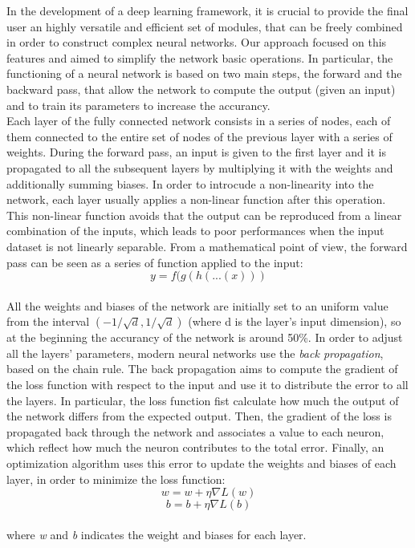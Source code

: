 \documentclass[10pt,conference,compsocconf]{IEEEtran}
\begin{document}
   In the development of a deep learning framework, it is crucial to provide the final user an highly versatile and efficient set of modules, that can be freely combined in order to construct complex neural networks. Our approach focused on this features and aimed to simplify the network basic operations. In particular, the functioning of a neural network is based on two main steps, the forward and the backward pass, that allow the network to compute the output (given an input) and to train its parameters to increase the accurancy.\\
   Each layer of the fully connected network consists in a series of nodes, each of them connected to the entire set of nodes of the previous layer with a series of weights. During the forward pass, an input is given to the first layer and it is propagated to all the subsequent layers by multiplying it with the weights and additionally summing biases. In order to introcude a non-linearity into the network, each layer usually applies a non-linear function after this operation. This non-linear function avoids that the output can be reproduced from a linear combination of the inputs, which leads to poor performances when the input dataset is not linearly separable. From a mathematical point of view, the forward pass can be seen as a series of function applied to the input:\\
   \[y = f(g(h(...(x)))\]\\
   All the weights and biases of the network are initially set to an uniform value from the interval $(-1/\sqrt{d}, 1/\sqrt{d}) $ (where d is the layer's input dimension), so at the beginning the accurancy of the network is around 50\%. In order to adjust all the layers' parameters, modern neural networks use the \textit{back propagation}, based on the chain rule. The back propagation aims to compute the gradient of the loss function with respect to the input and use it to distribute the error to all the layers. In particular, the loss function fist calculate how much the output of the network differs from the expected output. Then, the gradient of the loss is propagated back through the network and associates a value to each neuron, which reflect how much the neuron contributes to the total error. Finally, an optimization algorithm uses this error to update the weights and biases of each layer, in order to minimize the loss function:\\
    \[w = w + \eta\nabla L(w)\]
    \[b = b + \eta\nabla L(b)\]\\
   where \textit{w} and \textit{b} indicates the weight and biases for each layer.
\end{document}

